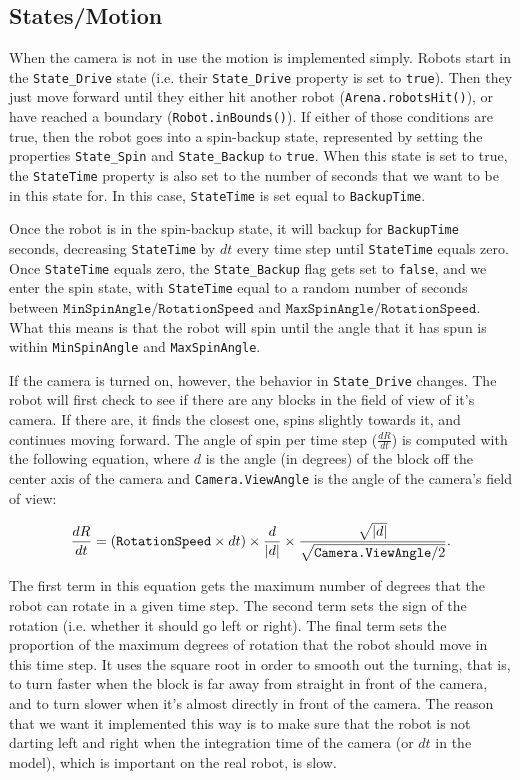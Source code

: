 \documentclass[12pt]{article}
\begin{document}
\subsection{States/Motion}
When the camera is not in use the motion is implemented simply. Robots start in the \texttt{State\_Drive} state (i.e. their \texttt{State\_Drive} property is set to \texttt{true}). Then they just move forward until they either hit another robot (\texttt{Arena.robotsHit()}), or have reached a boundary (\texttt{Robot.inBounds()}). If either of those conditions are true, then the robot goes into a spin-backup state, represented by setting the properties \texttt{State\_Spin} and \texttt{State\_Backup} to \texttt{true}. When this state is set to true, the \texttt{StateTime} property is also set to the number of seconds that we want to be in this state for. In this case, \texttt{StateTime} is set equal to \texttt{BackupTime}.

Once the robot is in the spin-backup state, it will backup for \texttt{BackupTime} seconds, decreasing \texttt{StateTime} by $dt$ every time step until \texttt{StateTime} equals zero. Once \texttt{StateTime} equals zero, the \texttt{State\_Backup} flag gets set to \texttt{false}, and we enter the spin state, with \texttt{StateTime} equal to a random number of seconds between $\texttt{MinSpinAngle} / \texttt{RotationSpeed}$ and $\texttt{MaxSpinAngle} / \texttt{RotationSpeed}$. What this means is that the robot will spin until the angle that it has spun is within \texttt{MinSpinAngle} and \texttt{MaxSpinAngle}.

If the camera is turned on, however, the behavior in \texttt{State\_Drive} changes. The robot will first check to see if there are any blocks in the field of view of it's camera. If there are, it finds the closest one, spins slightly towards it, and continues moving forward. The angle of spin per time step ($\frac{dR}{dt}$) is computed with the following equation, where $d$ is the angle (in degrees) of the block off the center axis of the camera and \texttt{Camera.ViewAngle} is the angle of the camera's field of view:

\begin{equation}
  \frac{dR}{dt} = (\texttt{RotationSpeed} \times dt) \times \frac{d}{\abs{d}} \times \frac{\sqrt{\abs{d}}}{\sqrt{\texttt{Camera.ViewAngle}/2}} .
\end{equation}

The first term in this equation gets the maximum number of degrees that the robot can rotate in a given time step. The second term sets the sign of the rotation (i.e. whether it should go left or right). The final term sets the proportion of the maximum degrees of rotation that the robot should move in this time step. It uses the square root in order to smooth out the turning, that is, to turn faster when the block is far away from straight in front of the camera, and to turn slower when it's almost directly in front of the camera. The reason that we want it implemented this way is to make sure that the robot is not darting left and right when the integration time of the camera (or $dt$ in the model), which is important on the real robot, is slow.
\end{document}
